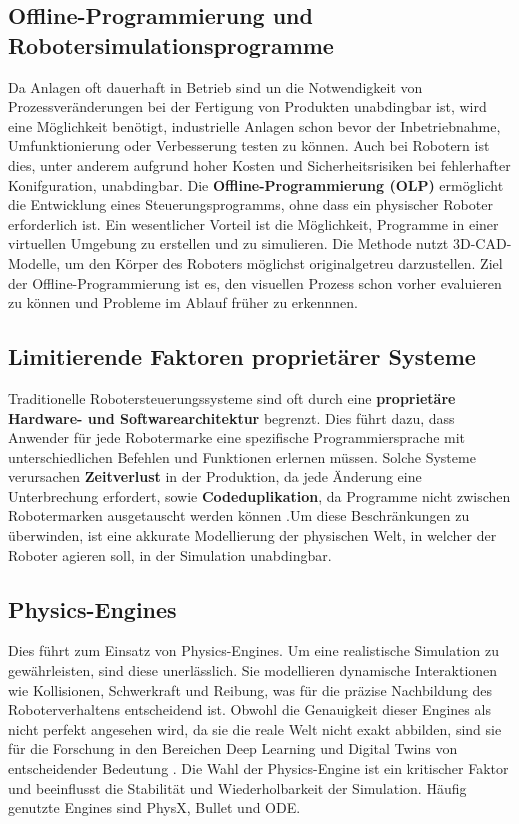 \subsection{Offline-Programmierung und Robotersimulationsprogramme} Da Anlagen
oft dauerhaft in Betrieb sind un die Notwendigkeit von Prozessveränderungen bei
der Fertigung von Produkten unabdingbar ist, wird eine Möglichkeit benötigt,
industrielle Anlagen schon bevor der Inbetriebnahme, Umfunktionierung oder
Verbesserung testen zu können. Auch bei Robotern ist dies, unter anderem
aufgrund hoher Kosten und Sicherheitsrisiken bei fehlerhafter Konifguration,
unabdingbar. Die \textbf{Offline-Programmierung (OLP)} ermöglicht die
Entwicklung eines Steuerungsprogramms, ohne dass ein physischer Roboter
erforderlich ist. Ein wesentlicher Vorteil ist die Möglichkeit, Programme in
einer virtuellen Umgebung zu erstellen und zu simulieren. Die Methode nutzt
3D-CAD-Modelle, um den Körper des Roboters möglichst originalgetreu
darzustellen. Ziel der Offline-Programmierung ist es, den visuellen Prozess
schon vorher evaluieren zu können und Probleme im Ablauf früher zu erkennnen.


\subsection{Limitierende Faktoren proprietärer Systeme} Traditionelle
Robotersteuerungssysteme sind oft durch eine \textbf{proprietäre Hardware- und
	Softwarearchitektur} begrenzt.  Dies führt dazu, dass
Anwender für jede Robotermarke eine spezifische Programmiersprache mit
unterschiedlichen Befehlen und Funktionen erlernen müssen. Solche Systeme
verursachen \textbf{Zeitverlust} in der Produktion, da jede Änderung eine
Unterbrechung erfordert, sowie \textbf{Codeduplikation}, da Programme nicht
zwischen Robotermarken ausgetauscht werden können .Um
diese Beschränkungen zu überwinden, ist eine akkurate Modellierung der
physischen Welt, in welcher der Roboter agieren soll, in der Simulation
unabdingbar.

\subsection{Physics-Engines}
Dies führt zum Einsatz von {Physics-Engines}. Um eine
realistische Simulation zu gewährleisten, sind diese unerlässlich. Sie
modellieren dynamische Interaktionen wie Kollisionen, Schwerkraft und Reibung,
was für die präzise Nachbildung des Roboterverhaltens entscheidend ist. Obwohl
die Genauigkeit dieser Engines als nicht perfekt angesehen wird, da sie die
reale Welt nicht exakt abbilden, sind sie für die Forschung in den Bereichen
Deep Learning und Digital Twins von entscheidender Bedeutung
. Die Wahl der Physics-Engine ist ein kritischer
Faktor und beeinflusst die Stabilität und Wiederholbarkeit der Simulation.
Häufig genutzte Engines sind PhysX, Bullet und ODE.
